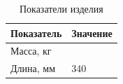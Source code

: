 \begin{table}
  \caption{Показатели изделия}
  \begin{tabular}{ll}
    \hline
    Показатель & Значение \\
    \hline
    Масса, кг &  \\ %
    Длина, мм & 340 \\
    \hline
  \end{tabular}
\end{table}
